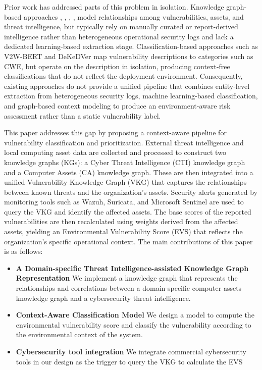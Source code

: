 \documentclass[conference]{IEEEtran}
\begin{document}
Prior work has addressed parts of this problem in isolation. Knowledge graph-based approaches \cite{b1}, \cite{b4}, \cite{b8}, \cite{b9}, \cite{b10} model relationships among vulnerabilities, assets, and threat intelligence, but typically rely on manually curated or report-derived intelligence rather than heterogeneous operational security logs and lack a dedicated learning-based extraction stage. Classification-based approaches such as V2W-BERT \cite{b6} and DeKeDVer \cite{b2} map vulnerability descriptions to categories such as CWE, but operate on the description in isolation, producing context-free classifications that do not reflect the deployment environment. Consequently, existing approaches do not provide a unified pipeline that combines entity-level extraction from heterogeneous security logs, machine learning-based classification, and graph-based context modeling to produce an environment-aware risk assessment rather than a static vulnerability label.

This paper addresses this gap by proposing a context-aware pipeline for vulnerability classification and prioritization. External threat intelligence and local computing asset data are collected and processed to construct two knowledge graphs (KGs): a Cyber Threat Intelligence (CTI) knowledge graph and a Computer Assets (CA) knowledge graph. These are then integrated into a unified Vulnerability Knowledge Graph (VKG) that captures the relationships between known threats and the organization’s assets. Security alerts generated by monitoring tools such as Wazuh, Suricata, and Microsoft Sentinel are used to query the VKG and identify the affected assets. The base scores of the reported vulnerabilities are then recalculated using weights derived from the affected assets, yielding an Environmental Vulnerability Score (EVS) that reflects the organization’s specific operational context. The main contributions of this paper is as follows: 
\begin{itemize}
    \item \textbf{A Domain-specific Threat Intelligence-assisted Knowledge Graph Representation } We implement a knowledge graph that represents the relationships and correlations between a domain-specific computer assets knowledge graph and a cybersecurity threat intelligence. 
    \item \textbf{Context-Aware Classification Model} We design a model to compute the environmental vulnerability score and classify the vulnerability according to the environmental context of the system.
    \item \textbf{Cybersecurity tool integration} We integrate commercial cybersecurity tools in our design as the trigger to query the VKG to calculate the EVS
\end{itemize}
\end{document}
